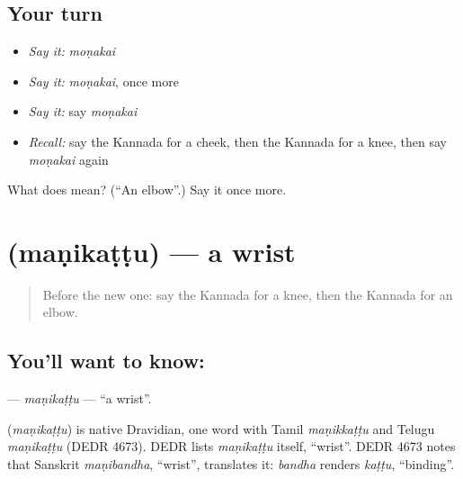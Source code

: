 \subsection*{Your turn}
\begin{itemize}
\raggedright
  \item \emph{Say it:} \emph{moṇakai}
  \item \emph{Say it:} \emph{moṇakai}, once more
  \item \emph{Say it:} say \emph{moṇakai}
  \item \emph{Recall:} say the Kannada for a cheek, then the Kannada for a knee, then say \emph{moṇakai} again
\end{itemize}

\begin{tcolorbox}[breakable,colback=teal!4,colframe=teal!35!black,title={Before you move on}]
What does  mean? (\textquotedblleft{}An elbow\textquotedblright{}.) Say it once more.
\end{tcolorbox}
\section[\texorpdfstring{\kn{ಮಣಿಕಟ್ಟು} (maṇikaṭṭu)}{ಮಣಿಕಟ್ಟು (maṇikaṭṭu)}]{ (maṇikaṭṭu) — a wrist}

\label{lesson:KA-C135-manikattu}



\begin{quote}
Before the new one: say the Kannada for a knee, then the Kannada for an elbow.
\end{quote}

\subsection*{You'll want to know: }
\textbf{} — \emph{maṇikaṭṭu} — \textquotedblleft{}a wrist\textquotedblright{}.

\begin{cousinweb}
\textbf{} (\emph{maṇikaṭṭu}) is native Dravidian, one word with Tamil \emph{maṇikkaṭṭu} and Telugu \emph{maṇikaṭṭu} (DEDR 4673). DEDR lists \emph{maṇikaṭṭu} itself, \textquotedblleft{}wrist\textquotedblright{}. DEDR 4673 notes that Sanskrit \emph{maṇibandha}, \textquotedblleft{}wrist\textquotedblright{}, translates it: \emph{bandha} renders \emph{kaṭṭu}, \textquotedblleft{}binding\textquotedblright{}.
\end{cousinweb}

